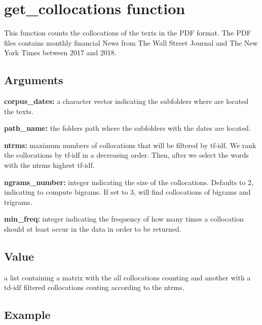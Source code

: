 \documentclass[]{article}
\begin{document}
\section{get\_collocations function}\label{get_collocations-function}

This function counts the collocations of the texts in the PDF format.
The PDF files contains monthly financial News from The Wall Street
Journal and The New York Times between 2017 and 2018.

\subsection{Arguments}\label{arguments-1}

\textbf{corpus\_dates:} a character vector indicating the subfolders
where are located the texts.

\textbf{path\_name:} the folders path where the subfolders with the
dates are located.

\textbf{ntrms:} maximum numbers of collocations that will be filtered by
tf-idf. We rank the collocations by tf-idf in a decreasing order. Then,
after we select the words with the ntrms highest tf-idf.

\textbf{ngrams\_number:} integer indicating the size of the
collocations. Defaults to 2, indicating to compute bigrams. If set to 3,
will find collocations of bigrams and trigrams.

\textbf{min\_freq:} integer indicating the frequency of how many times a
collocation should at least occur in the data in order to be returned.

\subsection{Value}\label{value-1}

a list containing a matrix with the all collocations counting and
another with a td-idf filtered collocations couting according to the
ntrms.

\subsection{Example}\label{example-1}
\end{document}
